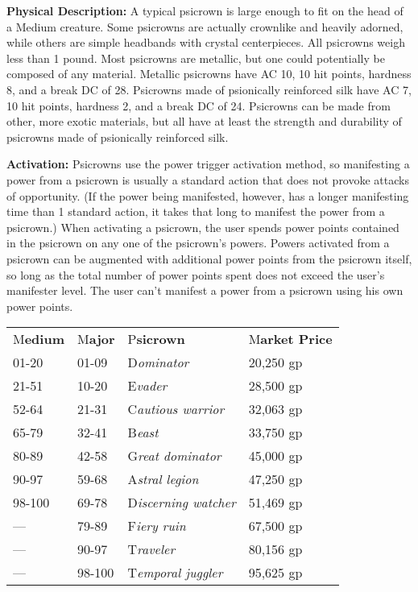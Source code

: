 \documentclass{article}
\begin{document}
\textbf{Physical Description:} A typical psicrown is large enough to fit on the 
head of a Medium creature. Some psicrowns are actually crownlike and heavily adorned, 
while others are simple headbands with crystal centerpieces. All psicrowns weigh 
less than 1 pound. Most psicrowns are metallic, but one could potentially be composed 
of any material. Metallic psicrowns have AC 10, 10 hit points, hardness 8, and 
a break DC of 28. Psicrowns made of psionically reinforced silk have AC 7, 10 hit 
points, hardness 2, and a break DC of 24. Psicrowns can be made from other, more 
exotic materials, but all have at least the strength and durability of psicrowns 
made of psionically reinforced silk.

\textbf{Activation:} Psicrowns use the power trigger activation method, so manifesting 
a power from a psicrown is usually a standard action that does not provoke attacks 
of opportunity. (If the power being manifested, however, has a longer manifesting 
time than 1 standard action, it takes that long to manifest the power from a psicrown.) 
When activating a psicrown, the user spends power points contained in the psicrown 
on any one of the psicrown's powers. Powers activated from a psicrown can be augmented 
with additional power points from the psicrown itself, so long as the total number 
of power points spent does not exceed the user's manifester level. The user can't 
manifest a power from a psicrown using his own power points.

\begin{tabular}{|>{\raggedright}p{34pt}|>{\raggedright}p{28pt}|>{\raggedright}p{78pt}|>{\raggedright}p{55pt}|}
\hline
\multicolumn{4}{|p{197pt}|}{T\textbf{able: Psicrowns}}\tabularnewline
\hline
M\textbf{edium} & M\textbf{ajor} & P\textbf{sicrown} & M\textbf{arket Price}\tabularnewline
\hline
01-20 & 01-09 & D\textit{ominator} & 20,250 gp\tabularnewline
\hline
21-51 & 10-20 & E\textit{vader} & 28,500 gp\tabularnewline
\hline
52-64 & 21-31 & C\textit{autious warrior} & 32,063 gp\tabularnewline
\hline
65-79 & 32-41 & B\textit{east} & 33,750 gp\tabularnewline
\hline
80-89 & 42-58 & G\textit{reat dominator} & 45,000 gp\tabularnewline
\hline
90-97 & 59-68 & A\textit{stral legion} & 47,250 gp\tabularnewline
\hline
98-100 & 69-78 & D\textit{iscerning watcher} & 51,469 gp\tabularnewline
\hline
--- & 79-89 & F\textit{iery ruin} & 67,500 gp\tabularnewline
\hline
--- & 90-97 & T\textit{raveler} & 80,156 gp\tabularnewline
\hline
--- & 98-100 & T\textit{emporal juggler} & 95,625 gp\tabularnewline
\hline
\end{tabular}
\end{document}
